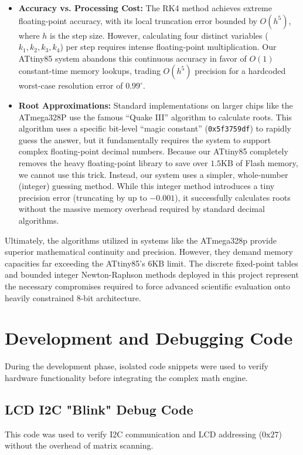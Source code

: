 \documentclass[conference]{IEEEtran}
\begin{document}
\begin{itemize}
    \item \textbf{Accuracy vs. Processing Cost:} The RK4 method achieves extreme floating-point accuracy, with its local truncation error bounded by $O(h^5)$, where $h$ is the step size. However, calculating four distinct variables ($k_1, k_2, k_3, k_4$) per step requires intense floating-point multiplication. Our ATtiny85 system abandons this continuous accuracy in favor of $O(1)$ constant-time memory lookups, trading $O(h^5)$ precision for a hardcoded worst-case resolution error of $0.99^\circ$.
    \item \textbf{Root Approximations:} Standard implementations on larger chips like the ATmega328P use the famous ``Quake III'' algorithm to calculate roots. This algorithm uses a specific bit-level ``magic constant'' (\texttt{0x5f3759df}) to rapidly guess the answer, but it fundamentally requires the system to support complex floating-point decimal numbers. Because our ATtiny85 completely removes the heavy floating-point library to save over $1.5\text{KB}$ of Flash memory, we cannot use this trick. Instead, our system uses a simpler, whole-number (integer) guessing method. While this integer method introduces a tiny precision error (truncating by up to $-0.001$), it successfully calculates roots without the massive memory overhead required by standard decimal algorithms.
\end{itemize}

Ultimately, the algorithms utilized in systems like the ATmega328p provide superior mathematical continuity and precision. However, they demand memory capacities far exceeding the ATtiny85's $6\text{KB}$ limit. The discrete fixed-point tables and bounded integer Newton-Raphson methods deployed in this project represent the necessary compromises required to force advanced scientific evaluation onto heavily constrained 8-bit architecture.

\section{Development and Debugging Code}
During the development phase, isolated code snippets were used to verify hardware functionality before integrating the complex math engine.

\subsection{LCD I2C "Blink" Debug Code}
This code was used to verify I2C communication and LCD addressing ($0\text{x}27$) without the overhead of matrix scanning.\\
\end{document}
